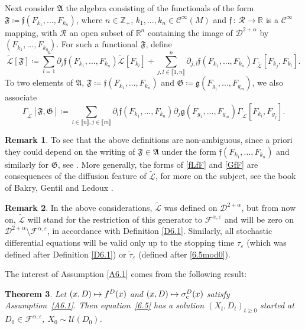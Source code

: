 \documentclass[JEP,XML,SOM,Unicode,NoFloatCountersInSection,published]{cedram}
\newcommand\mto{\mathchoice{\longmapsto}{\mapsto}{\mapsto}{\mapsto}}
\theoremstyle{plain}
\newtheorem{thm}{Theorem}[section]
\theoremstyle{definition}
\newtheorem{remark}[thm]{Remark}
\newcommand{\RR}{{\mathbb R}}
\newcommand{\ZZ}{\mathbb{Z}}
\newcommand{\SF}{{\mathscr F}}
\newcommand{\SL}{{\mathscr L}}
\newcommand{\SU}{{\mathscr U}}
\newcommand\df{\coloneqq}
\newcommand{\lin}{\llbracket}
\newcommand{\rin}{\rrbracket}
\newcommand{\bqn}[1]{\begin{equation}\label{#1}}
\newcommand{\eqn}{\end{equation}}
\newcommand{\st}{\,:\,}
\let\di\displaystyle
\let\a\alpha
\let\e\varepsilon
\let\pa\partial
\let\wi\widetilde
\let\iy\infty
\newcommand{\cC}{\mathcal{C}}
\newcommand{\cD}{\mathcal{D}}
\newcommand{\cF}{\mathcal{F}}
\newcommand{\cR}{\mathcal{R}}
\newcommand{\fA}{\mathfrak{A}}
\newcommand{\fG}{\mathfrak{G}}
\newcommand{\fF}{\mathfrak{F}}
\newcommand{\ff}{\mathfrak{f}}
\newcommand{\frg}{\mathfrak{g}}
\begin{document}
Next consider $\fA$ the algebra consisting of the
functionals of the form
$\fF\df\ff(F_{k_1},..., F_{k_n})$, where $n\in\ZZ_+$, $k_1,..., k_n\in \cC^\iy(M)$ and $\ff\st \cR\to \RR$ is a $\cC^\iy$ mapping, with $\cR$ an open subset of $\RR^n$ containing the image of $\cD^{2+\alpha}$ by $(F_{k_1},..., F_{k_n})$.
For such a functional $\fF$, define
\begin{equation}
\label{fLfF}
\wi\SL[\fF]
\df
\sum_{l=1}^n \pa_j\ff(F_{k_1},..., F_{k_n}) \wi\SL[F_{k_l}]
+\sum_{j,l\in\lin 1,n\rin}^n \pa_{j,l}\ff(F_{k_1},..., F_{k_n})\Gamma_{\wi\SL} [F_{k_j},F_{k_l}].
\end{equation}
To two elements of $\fA$, $\fF\df\ff(F_{k_1},..., F_{k_n})$ and $\fG\df\frg(F_{g_1},..., F_{g_m})$, we also associate
\bqn{GfF}
\Gamma_{\wi\SL} [\fF,\fG]\df \!\!\!\!\sum_{l\in\lin n\rin, j\in\lin m\rin} \pa_l\ff(F_{k_1},..., F_{k_n})\pa_j\frg(F_{g_1},..., F_{g_m})\Gamma_{\wi\SL} [F_{k_l},F_{g_j}].
\eqn
\par
\begin{remark}
To see that the above definitions are non-ambiguous, since a priori they could depend on the writing of $\fF\in\fA$ under the form
$\ff(F_{k_1},..., F_{k_n})$ and similarly for $\fG$, see \cite[Rem.\,2]{zbMATH07470497}. More generally, the forms of \eqref{fLfF} and \eqref{GfF}
are consequences of the diffusion feature of $\wi\SL$, for more on the subject, see \eg the book of Bakry, Gentil and Ledoux \cite{MR3155209}.
\end{remark}
\par
\begin{remark}\label{rm-stop}
In the above considerations, $\wi\SL$ was defined on $\cD^{2+\a}$, but from now on, $\wi\SL$ will stand for the restriction of this generator
to $\cF^{\a,\e}$ and will be zero on $\cD^{2+\a}\setminus\cF^{\a,\e}$, in accordance with Definition \ref{D6.1}. Similarly, all stochastic differential equations
will be valid only up to the stopping time $\tau_\e$ (which was defined after Definition \ref{D6.1}) or $\wi\tau_\e$ (defined after \eqref{6.5mod0}).
\end{remark}
\par
The interest of Assumption \ref{A6.1} comes from the following result:
\begin{thm}
\label{C6.1}
Let $(x,D)\mto f^D(x)$ and $(x,D)\mto \sigma_{\mathrm c}^D(x)$ satisfy Assumption~\ref{A6.1}. Then
equation~\eqref{6.5} has a solution $\di \left(X_{t}, D_t\right)_{t\geq 0}$ started at $D_0\in \SF^{\a, \e}$, $X_0\sim \SU(D_0)$.
\end{thm}
\end{document}
